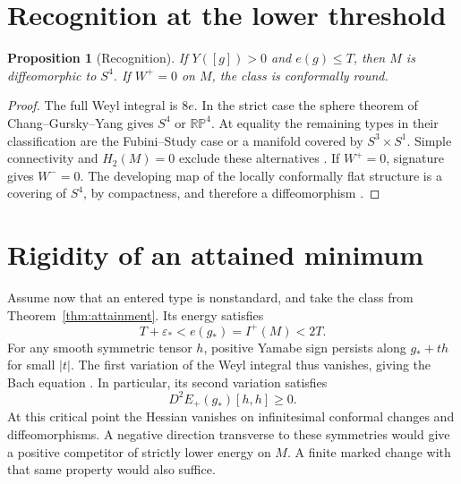 \documentclass[11pt,letterpaper]{article}
\numberwithin{equation}{section}
\newtheorem{proposition}[theorem]{Proposition}
\begin{document}
\section{Recognition at the lower threshold}\label{sec:recognition}

\begin{proposition}[Recognition]\label{prop:recognition}
If \(Y([g])>0\) and \(e(g)\le T\), then \(M\) is diffeomorphic to \(S^4\).
If \(W^+=0\) on \(M\), the class is conformally round.
\end{proposition}
\begin{proof}
The full Weyl integral is \(8e\). In the strict case the sphere theorem
of Chang--Gursky--Yang gives \(S^4\) or \(\mathbb{RP}^4\). At equality
the remaining types in their classification are the Fubini--Study case
or a manifold covered by \(S^3\times S^1\). Simple connectivity and
\(H_2(M)=0\) exclude these alternatives
\cite[Theorems A and B, Remark 2]{ChangGurskyYang2003}.
If \(W^+=0\), signature gives \(W^-=0\). The developing map of the
locally conformally flat structure is a covering of \(S^4\), by compactness,
and therefore a diffeomorphism \cite{Kuiper1949}.
\end{proof}






\section{Rigidity of an attained minimum}\label{sec:rigidity}

Assume now that an entered type is nonstandard, and take the class from
Theorem~\ref{thm:attainment}. Its energy satisfies
\begin{equation}\label{eq:band}
             T+\varepsilon_*<e(g_*)=I^+(M)<2T .
\end{equation}
For any smooth symmetric tensor \(h\), positive Yamabe sign persists
along \(g_*+th\) for small \(|t|\). The first variation of the Weyl
integral thus vanishes, giving the Bach equation
\cite[\S3]{ChangGurskyYang2003}. In particular, its second variation satisfies
\[
                D^2E_+(g_*)[h,h]\ge0 .
\]
At this critical point the Hessian vanishes on infinitesimal conformal changes and
diffeomorphisms. A negative direction transverse to these symmetries
would give a positive competitor of strictly lower energy on \(M\).
A finite marked change with that same property would also suffice.
\end{document}
